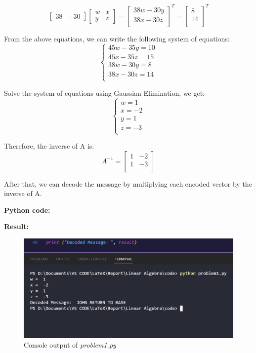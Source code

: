 \[
    \begin{bmatrix} 38 & -30 \end{bmatrix}
    \begin{bmatrix} w & x \\y & z \end{bmatrix}
    =
    \begin{bmatrix}
    38w -30y \\
    38x -30z \\
    \end{bmatrix}^T
    =
    \begin{bmatrix} 8 \\ 14 \\ \end{bmatrix}^T
\]

From the above equations, we can write the following system of equations:
\[
\begin{cases}
    45w -35y = 10 \\
    45x -35z = 15 \\
    38w -30y = 8 \\
    38x -30z = 14 \\
\end{cases}
\]

Solve the system of equations using Gaussian Elimination, we get:
\[
\begin{cases}
    w = 1 \\
    x = -2 \\
    y = 1 \\
    z = -3 \\
\end{cases}
\]

Therefore, the inverse of A is:
\[
    A^{-1} =
    \begin{bmatrix}
    1 & -2 \\
    1 & -3 \\
    \end{bmatrix}
\]

After that, we can decode the message by multiplying each encoded vector by the inverse of A.

\vspace*{1cm}

\textbf{Python code:}


\vspace*{0.5cm}

\textbf{Result:}
\begin{figure}[H]
    \centering
    \includegraphics[width=16cm]{graphics/1.png}
    \caption*{Console output of \textit{problem1.py}}
\end{figure}